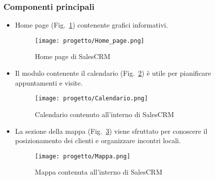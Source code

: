\subsubsection{Componenti principali}
\begin{itemize}
    \item Home page (Fig.~\ref{fig:salesCRM-home}) contenente grafici informativi.
    
    \begin{figure}[!h] 
        \centering 
        \texttt{[image: progetto/Home\_page.png]} 
        \caption{Home page di SalesCRM}
        \label{fig:salesCRM-home}
      \end{figure}

    \item Il modulo contenente il calendario (Fig.~\ref{fig:salesCRM-calendario}) è utile per pianificare appuntamenti e visite.
    
    \begin{figure}[!h] 
        \centering 
        \texttt{[image: progetto/Calendario.png]} 
        \caption{Calendario contenuto all'interno di SalesCRM}
        \label{fig:salesCRM-calendario}
      \end{figure}

    \item La sezione della mappa (Fig.~\ref{fig:salesCRM-mappa}) viene sfruttato per conoscere il posizionamento dei clienti e organizzare incontri locali.
    
    \begin{figure}[!h] 
        \centering 
        \texttt{[image: progetto/Mappa.png]} 
        \caption{Mappa contenuta all'interno di SalesCRM}
        \label{fig:salesCRM-mappa}
      \end{figure}
    
\end{itemize}

\newpage

